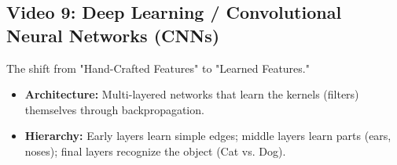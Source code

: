 \documentclass[11pt]{article}
\begin{document}
\subsection{Video 9: Deep Learning / Convolutional Neural Networks (CNNs)}
The shift from "Hand-Crafted Features" to "Learned Features."
\begin{itemize}
    \item \textbf{Architecture:} Multi-layered networks that learn the kernels (filters) themselves through backpropagation.
    \item \textbf{Hierarchy:} Early layers learn simple edges; middle layers learn parts (ears, noses); final layers recognize the object (Cat vs. Dog).
\end{itemize}
\end{document}
